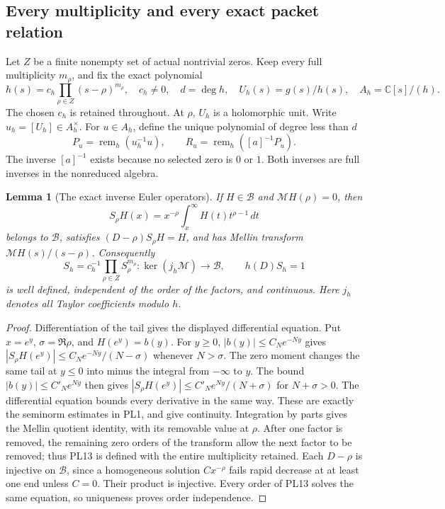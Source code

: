 \documentclass[11pt,a4paper]{article}
\newtheorem{lemma}[theorem]{Lemma}
\theoremstyle{definition}\newtheorem{definition}[theorem]{Definition}
\newcommand{\C}{\mathbb C}\newcommand{\R}{\mathbb R}
\providecommand{\rem}{\operatorname{rem}}
\begin{document}
\subsection{Every multiplicity and every exact packet relation}
Let \(Z\) be a finite nonempty set of actual nontrivial zeros.
Keep every full multiplicity \(m_\rho\), and fix the exact polynomial
\[
 h(s)=c_h\prod_{\rho\in Z}(s-\rho)^{m_\rho},\quad c_h\ne0,\quad
 d=\deg h,\quad U_h(s)=g(s)/h(s),\quad A_h=\C[s]/(h).
 \tag{PL10}\label{pl:pl:packet}
\]
The chosen \(c_h\) is retained throughout. At \(\rho\), \(U_h\) is
a holomorphic unit. Write \(u_h=[U_h]\in A_h^\times\).
For \(u\in A_h\), define the unique polynomial of degree less than \(d\)
\[
 P_u=\rem_h(u_h^{-1}u),\qquad
 R_u=\rem_h([a]^{-1}P_u).
 \tag{PL11}\label{pl:pl:remainders}
\]
The inverse \([a]^{-1}\) exists because no selected zero is \(0\)
or \(1\). Both inverses are full inverses in the nonreduced algebra.

\begin{lemma}[The exact inverse Euler operators]\label{pl:lem:euler}
If \(H\in\mathscr B\) and \(\mathcal M H(\rho)=0\), then
\[
 S_\rho H(x)=x^{-\rho}\int_x^\infty H(t)t^{\rho-1}\,dt
 \tag{PL12}\label{pl:pl:euler}
\]
belongs to \(\mathscr B\), satisfies \((D-\rho)S_\rho H=H\), and has
Mellin transform \(\mathcal M H(s)/(s-\rho)\). Consequently
\[
 S_h=c_h^{-1}\prod_{\rho\in Z}S_\rho^{m_\rho}:
       \ker(j_h\mathcal M)\longrightarrow\mathscr B,\qquad h(D)S_h=1
 \tag{PL13}\label{pl:pl:inverse-h}
\]
is well defined, independent of the order of the factors, and
continuous. Here \(j_h\) denotes all Taylor coefficients modulo \(h\).
\end{lemma}
\begin{proof}
Differentiation of the tail gives the displayed differential equation.
Put \(x=e^y\), \(\sigma=\Re\rho\), and \(H(e^y)=b(y)\).
For \(y\ge0\), \(|b(y)|\le C_Ne^{-Ny}\) gives
\(|S_\rho H(e^y)|\le C_Ne^{-Ny}/(N-\sigma)\) whenever \(N>\sigma\).
The zero moment changes the same tail at \(y\le0\) into minus the
integral from \(-\infty\) to \(y\). The bound
\(|b(y)|\le C'_Ne^{Ny}\) then gives
\(|S_\rho H(e^y)|\le C'_Ne^{Ny}/(N+\sigma)\) for \(N+\sigma>0\).
The differential equation bounds every derivative in the same way.
These are exactly the seminorm estimates in PL1, and give continuity.
Integration by parts gives the Mellin quotient identity, with its
removable value at \(\rho\).
After one factor is removed, the remaining zero orders of the
transform allow the next factor to be removed; thus PL13 is defined
with the entire multiplicity retained. Each \(D-\rho\) is injective
on \(\mathscr B\), since a homogeneous solution \(C x^{-\rho}\) fails rapid
decrease at at least one end unless \(C=0\). Their product is
injective. Every order of PL13 solves the same equation, so
uniqueness proves order independence.
\end{proof}
\end{document}
